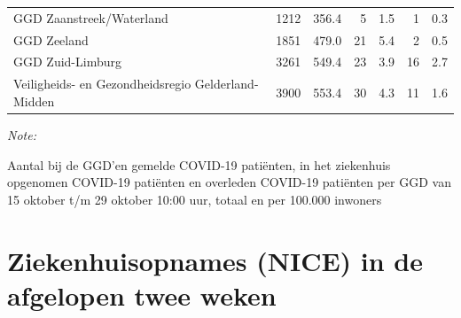 \documentclass[
  english,
  man,floatsintext]{apa6}
\begin{document}
\begin{table}
\begin{threeparttable}
\begin{tabular}{lrrrrrr}
GGD Zaanstreek/Waterland & 1212 & 356.4 & 5 & 1.5 & 1 & 0.3\\
GGD Zeeland & 1851 & 479.0 & 21 & 5.4 & 2 & 0.5\\
GGD Zuid-Limburg & 3261 & 549.4 & 23 & 3.9 & 16 & 2.7\\
Veiligheids- en Gezondheidsregio Gelderland-Midden & 3900 & 553.4 & 30 & 4.3 & 11 & 1.6\\
\bottomrule
\end{tabular}
\begin{tablenotes}
\item \textit{Note: } 
\item Aantal bij de GGD’en gemelde COVID-19 patiënten, in het ziekenhuis opgenomen COVID-19 patiënten en overleden COVID-19 patiënten per GGD van 15 oktober t/m 29 oktober 10:00 uur, totaal en per 100.000 inwoners
\end{tablenotes}
\end{threeparttable}
\endgroup{}
\end{table}

\newpage

\hypertarget{ziekenhuisopnames-nice-in-de-afgelopen-twee-weken}{%
\section{Ziekenhuisopnames (NICE) in de afgelopen twee weken}\label{ziekenhuisopnames-nice-in-de-afgelopen-twee-weken}}
\end{document}
